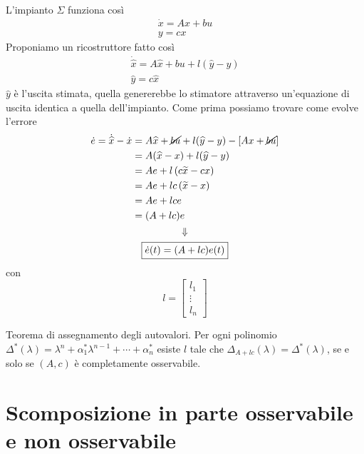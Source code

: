 L'impianto $\Sigma $ funziona così
\begin{gather*}
	\dot{x} =Ax+bu\\
	y=cx
\end{gather*}
Proponiamo un ricostruttore fatto così
\begin{gather*}
	\boxed{\dot{\hat{x}} =A\hat{x} +bu+l(\hat{y} -y)}\\
	\hat{y} =c\hat{x}
\end{gather*}
$\hat{y}$ è l'uscita stimata, quella genererebbe lo stimatore attraverso un'equazione di uscita identica a quella dell'impianto. Come prima possiamo trovare come evolve l'errore
\begin{gather*}
	\begin{aligned}
		\dot{e} =\dot{\hat{x}} -\dot{x} & =A\hat{x} +\cancel{bu} +l(\hat{y} -y) -\left[ Ax+\cancel{bu}\right] \\
		                                & =A(\hat{x} -x) +l(\hat{y} -y)                                       \\
		                                & =Ae+l\left(c\tilde{x} -cx\right)                                    \\
		                                & =Ae+lc\left(\tilde{x} -x\right)                                     \\
		                                & =Ae+lce                                                             \\
		                                & =(A+lc) e                                                           
	\end{aligned}\\
	\Downarrow \\
	\boxed{\dot{e}(t) =(A+lc) e(t)}
\end{gather*}
con
\begin{equation*}
	l=\begin{bmatrix}
	l_1\\
	\vdots \\
	l_n
	\end{bmatrix}
\end{equation*}
\begin{thm}
	Teorema di assegnamento degli autovalori. Per ogni polinomio $\Delta ^{*}(\lambda) =\lambda ^n +\alpha ^{*}_1 \lambda ^{n-1} +\cdots +\alpha ^{*}_n$ esiste $l$ tale che $\Delta _{A+lc}(\lambda) =\Delta ^{*}(\lambda)$, se e solo se $(A,c)$ è completamente osservabile.
\end{thm}

\section{Scomposizione in parte osservabile e non osservabile}

